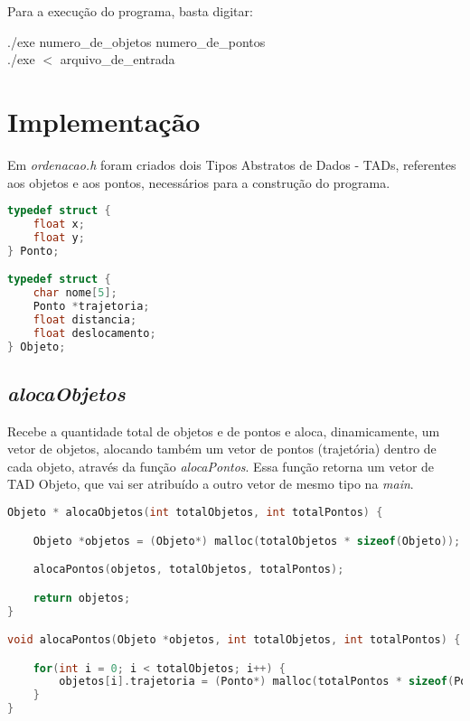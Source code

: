 \documentclass{article}
\begin{document}
Para a execução do programa, basta digitar:\\

\begin{tcolorbox}[title=,width=\linewidth]
    ./exe numero\_de\_objetos numero\_de\_pontos\\
    ./exe $<$ arquivo\_de\_entrada
\end{tcolorbox}

\clearpage


\section{Implementação}

\hspace*{\parindent}Em \textit{ordenacao.h} foram criados dois Tipos Abstratos de Dados - TADs, referentes aos objetos e aos pontos, necessários para a construção do programa.

\begin{lstlisting}[label={lst:cod1},language=C]
typedef struct {
    float x;
    float y;
} Ponto;

typedef struct {
    char nome[5];
    Ponto *trajetoria;
    float distancia;
    float deslocamento;
} Objeto;
\end{lstlisting}


\subsection{\textit{alocaObjetos}}

\hspace*{\parindent}Recebe a quantidade total de objetos e de pontos e aloca, dinamicamente, um vetor de objetos, alocando também um vetor de pontos (trajetória) dentro de cada objeto, através da função \textit{alocaPontos}. Essa função retorna um vetor de TAD Objeto, que vai ser atribuído a outro vetor de mesmo tipo na \textit{main}.

\begin{lstlisting}[label={lst:cod1},language=C]
Objeto * alocaObjetos(int totalObjetos, int totalPontos) {

    Objeto *objetos = (Objeto*) malloc(totalObjetos * sizeof(Objeto));

    alocaPontos(objetos, totalObjetos, totalPontos);

    return objetos;
}

void alocaPontos(Objeto *objetos, int totalObjetos, int totalPontos) {

    for(int i = 0; i < totalObjetos; i++) {
        objetos[i].trajetoria = (Ponto*) malloc(totalPontos * sizeof(Ponto));
    }
}
\end{lstlisting}
\end{document}
